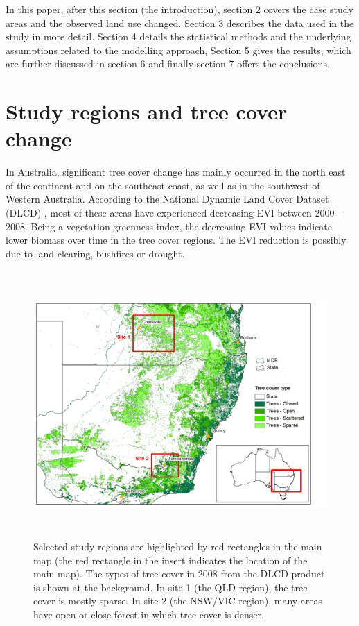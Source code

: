 \documentclass[authoryear,preprint,review,12pt]{elsarticle}
\begin{document}
In this paper, after this section (the introduction), section 2 covers the case study areas and the observed land use changed. Section 3 describes the data used in the study in more detail. Section 4 details the statistical methods and the underlying assumptions related to the modelling approach, Section 5 gives the results, which are further discussed in section 6 and finally section 7 offers the conclusions.  

\section{Study regions and tree cover change}

In Australia, significant tree cover change has mainly occurred in the north east of the continent and on the southeast coast, as well as in the southwest of Western Australia. According to the National Dynamic Land Cover Dataset (DLCD) \citep{Lymburner2010}, most of these areas have experienced decreasing EVI between 2000 - 2008. Being a vegetation greenness index, the decreasing EVI values indicate lower biomass over time in the tree cover regions. The EVI reduction is possibly due to land clearing, bushfires or drought. 

\begin{figure}[ht!]
  \centerline{\includegraphics[height = 4in,scale=0.5]{map_selreg.jpg}}
  \caption{Selected study regions are highlighted by red rectangles in the main map (the red rectangle in the insert indicates the location of the main map). The types of tree cover in 2008 from the DLCD product is shown at the background. In site 1 (the QLD region), the tree cover is mostly sparse. In site 2 (the NSW/VIC region), many areas have open or close forest in which tree cover is denser.}
  \label{fig:sel_reg}
\end{figure}
\end{document}
